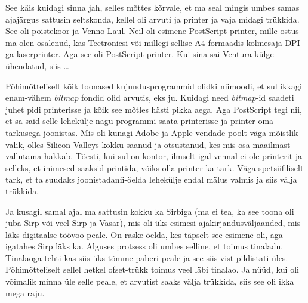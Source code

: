 
See käis kuidagi sinna jah, selles mõttes kõrvale, et ma seal mingis umbes 
samas ajajärgus sattusin seltskonda, kellel oli arvuti ja printer ja vaja  
midagi trükkida. See oli poistekoor ja Venno 
Laul. Neil oli esimene PostScript printer, mille 
ostus ma olen osalenud, kas Tectronicsi või millegi sellise A4 formaadis 
kolmesaja DPI-ga laserprinter. Aga see oli PostScript printer. Kui sina sai 
Ventura külge ühendatud, siis \ldots 

Põhimõtteliselt kõik toonased kujundusprogrammid olidki niimoodi, et sul ikkagi 
enam-vähem \emph{bitmap} fondid olid arvutis, eks ju. Kuidagi need 
\emph{bitmap}-id saadeti juhet pidi printerisse ja kõik see mõtles hästi pikka 
aega. Aga PostScript tegi nii, et sa said selle lehekülje nagu programmi saata 
printerisse ja printer oma tarkusega joonistas. Mis oli kunagi  Adobe ja Apple 
vendade poolt väga mõistlik valik, olles Silicon Valleys kokku saanud ja  
otsustanud, kes mis osa maailmast vallutama hakkab. Tõesti, kui sul on kontor, 
ilmselt igal vennal ei ole printerit ja selleks, et inimesed saaksid printida, 
võiks olla printer ka tark. Väga spetsiifiliselt tark, et ta suudaks 
joonistadanii-öelda lehekülje endal mälus valmis ja siis välja trükkida. 

Ja kusagil samal ajal ma sattusin kokku ka Sirbiga (ma ei tea, ka 
see toona oli juba Sirp või veel Sirp ja Vasar), mis oli üks esimesi 
ajakirjandusväljaanded, mis läks digitaalse töövoo peale. On raske öelda, kes  
täpselt see esimene oli, aga igatahes Sirp läks ka. Alguses protsess oli umbes 
selline, et toimus tinaladu. Tinalaoga tehti kas siis üks tõmme paberi peale ja 
see siis vist pildistati üles. Põhimõtteliselt sellel hetkel ofset-trükk toimus 
veel läbi tinalao. Ja nüüd, kui oli võimalik minna üle selle peale, et arvutist 
saaks välja trükkida, siis see oli ikka mega raju.


